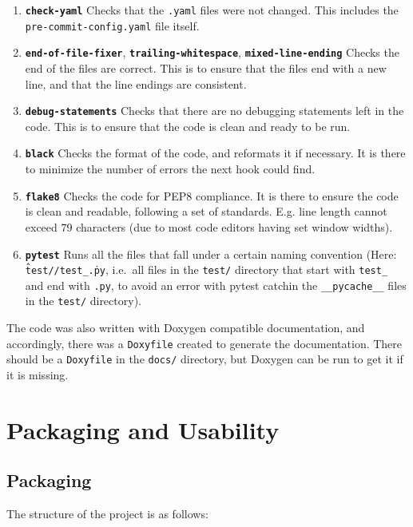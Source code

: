 \documentclass[12pt]{report} %
\begin{document}
\begin{enumerate}
  \item \textbf{\texttt{check-yaml}} Checks that the \texttt{.yaml} files were not changed. This includes the \texttt{pre-commit-config.yaml} file itself.
  \item \textbf{\texttt{end-of-file-fixer}}, \textbf{\texttt{trailing-whitespace}}, \textbf{\texttt{mixed-line-ending}} Checks the end of the files are correct. This is to ensure that the files end with a new line, and that the line endings are consistent.
  \item \textbf{\texttt{debug-statements}} Checks that there are no debugging statements left in the code. This is to ensure that the code is clean and ready to be run.
  \item \textbf{\texttt{black}} Checks the format of the code, and reformats it if necessary. It is there to minimize the number of errors the next hook could find.
  \item \textbf{\texttt{flake8}} Checks the code for PEP8 compliance. It is there to ensure the code is clean and readable, following a set of standards. E.g. line length cannot exceed 79 characters (due to most code editors having set window widths\cite{pep8_}).
  \item \textbf{\texttt{pytest}} Runs all the files that fall under a certain naming convention (Here: \texttt{\^test//test\_.\*\.py}, i.e.\ all files in the \texttt{test/} directory that start with \texttt{test\_} and end with \texttt{.py}, to avoid an error with pytest catchin the \texttt{\_\_pycache\_\_} files in the \texttt{test/} directory). 
\end{enumerate}

The code was also written with Doxygen compatible documentation, and accordingly, there was a \texttt{Doxyfile} created to generate the documentation. There should be a \texttt{Doxyfile} in the \texttt{docs/} directory, but Doxygen can be run to get it if it is missing. 


\chapter{Packaging and Usability}

\section{Packaging}

The structure of the project is as follows:
\end{document}
